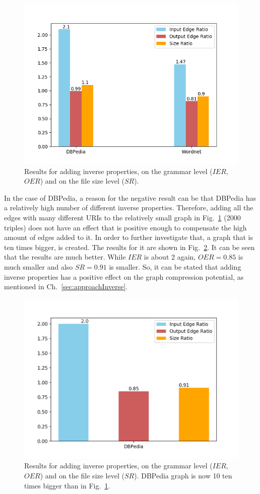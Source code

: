 \begin{figure}
	\centering
	\includegraphics[width=0.8\linewidth]{figures/4_evaluation/ontology/ratiosInverseAdd}
	\caption{Results for adding inverse properties, on the grammar level ($IER$, $OER$) and on the file size level ($SR$).}
	\label{fig:inverseAddResults}
\end{figure}

In the case of DBPedia, a reason for the negative result can be that DBPedia has a relatively high number of different inverse properties. Therefore, adding all the edges with many different URIs to the relatively small graph in Fig.~\ref{fig:inverseAddResults} (2000 triples) does not have an effect that is positive enough to compensate the high amount of edges added to it. In order to further investigate that, a graph that is ten times bigger, is created. The results for it are shown in Fig.~\ref{fig:inverseAddResultsBigger}. It can be seen that the results are much better. While $IER$ is about 2 again, $OER=0.85$ is much smaller and also $SR=0.91$ is smaller. So, it can be stated that adding inverse properties has a positive effect on the graph compression potential, as mentioned in Ch.~\ref{sec:approachInverse}.


\begin{figure}
	\centering
	\includegraphics[width=0.8\linewidth]{figures/4_evaluation/ontology/ratiosInverseAddBigger}
	\caption{Results for adding inverse properties, on the grammar level ($IER$, $OER$) and on the file size level ($SR$). DBPedia graph is now 10 ten times bigger than in Fig.~\ref{fig:inverseAddResults}.}
	\label{fig:inverseAddResultsBigger}
\end{figure}


